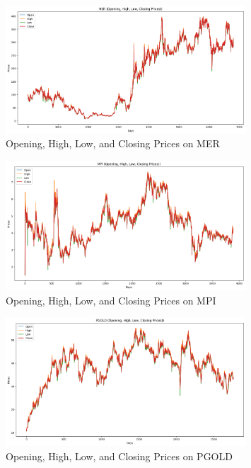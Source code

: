 \begin{figure}[ht]
    \centering
    \includegraphics[width=0.80\textwidth]{./assets/Appendices/B/OHLC_Prices/MER.png}
    \caption{Opening, High, Low, and Closing Prices on MER}
    \label{fig:ohlc_MER}
\end{figure}
\FloatBarrier

\begin{figure}[ht]
    \centering
    \includegraphics[width=0.80\textwidth]{./assets/Appendices/B/OHLC_Prices/MPI.png}
    \caption{Opening, High, Low, and Closing Prices on MPI}
    \label{fig:ohlc_MPI}
\end{figure}
\FloatBarrier

\begin{figure}[ht]
    \centering
    \includegraphics[width=0.80\textwidth]{./assets/Appendices/B/OHLC_Prices/PGOLD.png}
    \caption{Opening, High, Low, and Closing Prices on PGOLD}
    \label{fig:ohlc_PGOLD}
\end{figure}
\FloatBarrier

